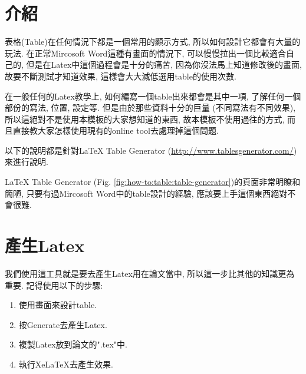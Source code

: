 \section{介紹}

表格(Table)在任何情況下都是一個常用的顯示方式, 所以如何設計它都會有大量的玩法. 在正常Mircosoft Word這種有畫面的情況下, 可以慢慢拉出一個比較適合自己的, 但是在Latex中這個過程會是十分的痛苦, 因為你沒法馬上知道修改後的畫面, 故要不斷測試才知道效果, 這樣會大大減低選用table的使用次數.

在一般任何的Latex教學上, 如何編寫一個table出來都會是其中一項, 了解任何一個部份的寫法, 位置, 設定等. 但是由於那些資料十分的巨量 (不同寫法有不同效果), 所以這絕對不是使用本模板的大家想知道的東西, 故本模板不使用過往的方式, 而且直接教大家怎樣使用現有的online tool去處理掉這個問題.

以下的說明都是針對LaTeX Table Generator (\url{http://www.tablesgenerator.com/})\cite{web:latex:table-generator}來進行說明.

LaTeX Table Generator (Fig. \ref{fig:how-to:table:table-generator})的頁面非常明瞭和簡陋, 只要有過Mircosoft Word中的table設計的經驗, 應該要上手這個東西絕對不會很難.

\newpage
{}

\newpage
\section{產生Latex}

  我們使用這工具就是要去產生Latex用在論文當中, 所以這一步比其他的知識更為重要. 記得使用以下的步驟:

  \begin{enumerate}
    \item
    {
      使用畫面來設計table.
    } %

    \item
    {
      按Generate去產生Latex.
    } %

    \item
    {
      複製Latex放到論文的".tex"中.
    } %

    \item
    {
      執行XeLaTeX去產生效果.
    } %
  \end{enumerate}

